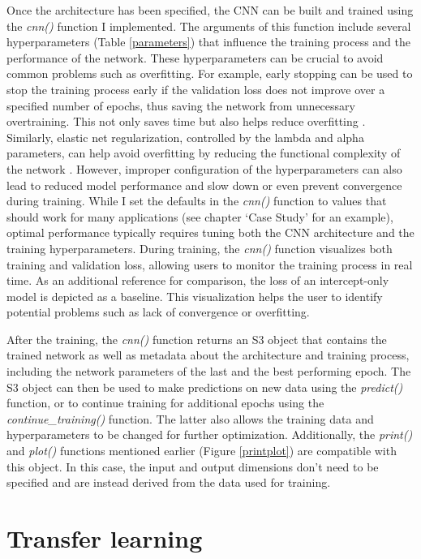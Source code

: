 \documentclass[12pt,twoside]{scrreport}
\newcommand{\pkg}[1]{`#1'}
\newcommand{\fn}[2][]{\textit{#2(}#1\textit{)}}
\begin{document}
Once the architecture has been specified, the CNN can be built and trained using the \fn{cnn} function I implemented. The arguments of this function include several hyperparameters (Table \ref{parameters}) that influence the training process and the performance of the network. These hyperparameters can be crucial to avoid common problems such as overfitting. For example, early stopping can be used to stop the training process early if the validation loss does not improve over a specified number of epochs, thus saving the network from unnecessary overtraining. This not only saves time but also helps reduce overfitting \citep{prechelt2002early}. Similarly, elastic net regularization, controlled by the lambda and alpha parameters, can help avoid overfitting by reducing the functional complexity of the network \citep{moradi2020survey}. However, improper configuration of the hyperparameters can also lead to reduced model performance and slow down or even prevent convergence during training. While I set the defaults in the \fn{cnn} function to values that should work for many applications (see chapter \pkg{Case Study} for an example), optimal performance typically requires tuning both the CNN architecture and the training hyperparameters. During training, the \fn{cnn} function visualizes both training and validation loss, allowing users to monitor the training process in real time. As an additional reference for comparison, the loss of an intercept-only model is depicted as a baseline. This visualization helps the user to identify potential problems such as lack of convergence or overfitting.

After the training, the \fn{cnn} function returns an S3 object that contains the trained network as well as metadata about the architecture and training process, including the network parameters of the last and the best performing epoch. The S3 object can then be used to make predictions on new data using the \fn{predict} function, or to continue training for additional epochs using the \fn{continue\_training} function. The latter also allows the training data and hyperparameters to be changed for further optimization. Additionally, the \fn{print} and \fn{plot} functions mentioned earlier (Figure \ref{printplot}) are compatible with this object. In this case, the input and output dimensions don't need to be specified and are instead derived from the data used for training.

\section*{Transfer learning}
\end{document}
